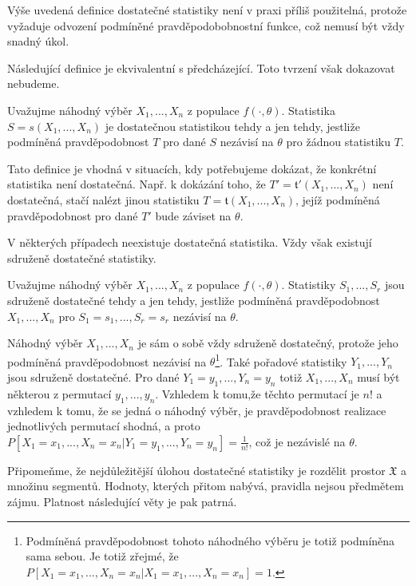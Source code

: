 Výše uvedená definice dostatečné statistiky není v praxi příliš použitelná, protože vyžaduje odvození podmíněné pravděpodobobnostní funkce, což nemusí být vždy snadný úkol.

Následující definice je ekvivalentní s předcházející. Toto tvrzení však dokazovat nebudeme.

\begin{definition}
Uvažujme náhodný výběr $X_1, ..., X_n$ z populace $f(\cdot, \theta)$. Statistika $S = s(X_1, ..., X_n)$ je dostatečnou statistikou tehdy a jen tehdy, jestliže podmíněná pravděpodobnost $T$ pro dané $S$ nezávisí na $\theta$ pro žádnou statistiku $T$.
\end{definition}

Tato definice je vhodná v situacích, kdy potřebujeme dokázat, že konkrétní statistika není dostatečná. Např. k dokázání toho, že $T' = \mathfrak{t}'(X_1, ..., X_n)$ není dostatečná, stačí nalézt jinou statistiku $T = \mathfrak{t}(X_1, ..., X_n)$, jejíž podmíněná pravděpodobnost pro dané $T'$ bude záviset na $\theta$.

V některých případech neexistuje dostatečná statistika. Vždy však existují sdruženě dostatečné statistiky.

\begin{definition}
Uvažujme náhodný výběr $X_1, ..., X_n$ z populace $f(\cdot, \theta)$. Statistiky $S_1, ..., S_r$ jsou sdruženě dostatečné tehdy a jen tehdy, jestliže podmíněná pravděpodobnost $X_1, ..., X_n$ pro $S_1 = s_1, ..., S_r = s_r$ nezávisí na $\theta$.
\end{definition}

Náhodný výběr $X_1, ..., X_n$ je sám o sobě vždy sdruženě dostatečný, protože jeho podmíněná pravděpodobnost nezávisí na $\theta$\footnote{Podmíněná pravděpodobnost tohoto náhodného výběru je totiž podmíněna sama sebou. Je totiž zřejmé, že $P[X_1 = x_1, ..., X_n = x_n | X_1 = x_1, ..., X_n = x_n] = 1$.}. Také pořadové statistiky $Y_1, ..., Y_n$ jsou sdruženě dostatečné. Pro dané $Y_1 = y_1, ..., Y_n = y_n$ totiž $X_1, ..., X_n$ musí být některou z permutací $y_1, ..., y_n$. Vzhledem k tomu,že těchto permutací je $n!$ a vzhledem k tomu, že se jedná o náhodný výběr, je pravděpodobnost realizace jednotlivých permutací shodná, a proto $P[X_1 = x_1, ..., X_n = x_n | Y_1 = y_1, ..., Y_n = y_n] = \frac{1}{n!}$, což je nezávislé na $\theta$.

Připomeňme, že nejdůležitější úlohou dostatečné statistiky je rozdělit prostor $\mathfrak{X}$ a množinu segmentů. Hodnoty, kterých přitom nabývá, pravidla nejsou předmětem zájmu. Platnost následující věty je pak patrná.

